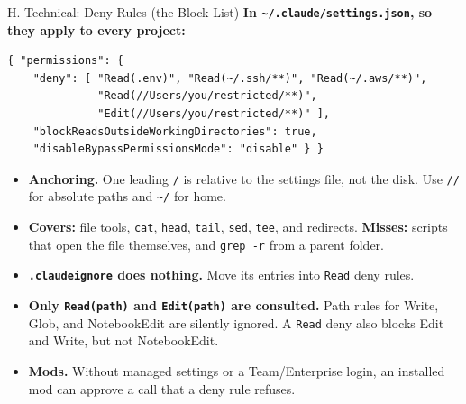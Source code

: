 \documentclass[aspectratio=169, 11pt]{beamer}
\begin{document}
\begin{frame}[fragile]{H. Technical: Deny Rules (the Block List)}
  \footnotesize
  \textbf{In \texttt{\textasciitilde/.claude/settings.json}, so they apply to every project:}
  \begin{lstlisting}[basicstyle=\ttfamily\tiny]
{ "permissions": {
    "deny": [ "Read(.env)", "Read(~/.ssh/**)", "Read(~/.aws/**)",
              "Read(//Users/you/restricted/**)",
              "Edit(//Users/you/restricted/**)" ],
    "blockReadsOutsideWorkingDirectories": true,
    "disableBypassPermissionsMode": "disable" } }
  \end{lstlisting}
  \vspace{-0.4em}
  \begin{itemize}\footnotesize
    \item \textbf{Anchoring.} One leading \texttt{/} is relative to the settings file, not the disk. Use \texttt{//} for absolute paths and \texttt{\textasciitilde/} for home.
    \item \textbf{Covers:} file tools, \texttt{cat}, \texttt{head}, \texttt{tail}, \texttt{sed}, \texttt{tee}, and redirects. \textbf{Misses:} scripts that open the file themselves, and \texttt{grep -r} from a parent folder.
    \item \textbf{\texttt{.claudeignore} does nothing.} Move its entries into \texttt{Read} deny rules.
    \item \textbf{Only \texttt{Read(path)} and \texttt{Edit(path)} are consulted.} Path rules for Write, Glob, and NotebookEdit are silently ignored. A \texttt{Read} deny also blocks Edit and Write, but not NotebookEdit.
    \item \textbf{Mods.} Without managed settings or a Team/Enterprise login, an installed mod can approve a call that a deny rule refuses.
  \end{itemize}
\end{frame}
\end{document}
